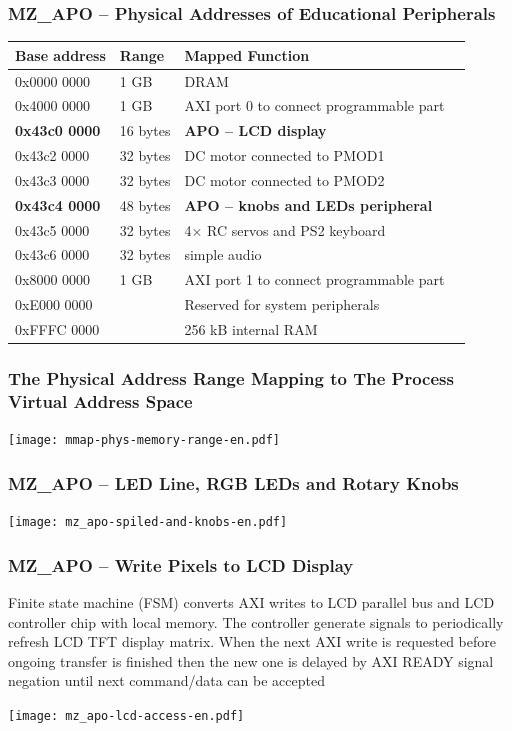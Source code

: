 \documentclass{beamer}
\begin{document}
\begin{frame}
\frametitle{MZ\_APO -- Physical Addresses of Educational Peripherals}

\begin{tabular}{|l|l|l|l|} \hline
Base address & Range & Mapped Function \\\hline
0x0000 0000 & 1 GB &  DRAM \\\hline
0x4000 0000 & 1 GB & AXI port 0 to connect programmable part \\\hline
\textbf{0x43c0 0000} & 16 bytes & \textbf{APO -- LCD display} \\\hline
0x43c2 0000 & 32 bytes & DC motor connected to PMOD1 \\\hline
0x43c3 0000 & 32 bytes & DC motor connected to PMOD2 \\\hline
\textbf{0x43c4 0000} & 48 bytes & \textbf{APO -- knobs and LEDs peripheral} \\\hline
0x43c5 0000 & 32 bytes & 4$\times$ RC servos and PS2 keyboard \\\hline
0x43c6 0000 & 32 bytes & simple audio \\\hline
0x8000 0000 & 1 GB & AXI port 1 to connect programmable part \\\hline
0xE000 0000 &      & Reserved for system peripherals\\\hline
0xFFFC 0000 &      & 256 kB internal RAM \\\hline

\end{tabular} 

\end{frame}


\begin{frame}
\frametitle{The Physical Address Range Mapping to The Process Virtual Address Space}

\texttt{[image: mmap-phys-memory-range-en.pdf]}

\end{frame}

\begin{frame}
\frametitle{MZ\_APO -- LED Line, RGB LEDs and Rotary Knobs}

\texttt{[image: mz\_apo-spiled-and-knobs-en.pdf]}

\end{frame}

\begin{frame}
\frametitle{MZ\_APO -- Write Pixels to LCD Display}

Finite state machine (FSM) converts AXI writes to LCD parallel bus and LCD controller chip with local memory. The controller generate signals to periodically refresh LCD TFT display matrix.
When the next AXI write is requested before ongoing transfer is finished then the new one is delayed by AXI READY signal negation until next command/data can be accepted

\texttt{[image: mz\_apo-lcd-access-en.pdf]}

\end{frame}
\end{document}
